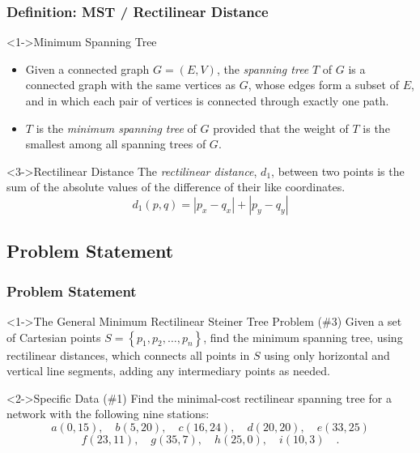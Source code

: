 \documentclass{beamer}
\begin{document}
\begin{frame}
\frametitle{Definition: MST / Rectilinear Distance}
\begin{block}<1->{Minimum Spanning Tree}
\begin{itemize}
\item<1-> {
Given a connected graph \(G = (E, V)\), the \emph{spanning tree} \(T\) of \(G\) is a connected graph with the same vertices as \(G\), whose edges form a subset of \(E\), and in which each pair of vertices is connected through exactly one path.
}
\item<2-> {
\(T\) is the \emph{minimum spanning tree} of \(G\) provided that the weight of \(T\) is the smallest among all
spanning trees of \(G\).
}
\end{itemize}	
\end{block}

\begin{block}<3->{Rectilinear Distance}
The \emph{rectilinear distance}, \(d_1\),  between two points is the sum of the absolute values of the difference of their like coordinates.
\[d_1 (p, q) = \left|p_x - q_x\right| + \left|p_y - q_y\right|\]
\end{block}
\end{frame}

\subsection{Problem Statement}
\begin{frame}
\frametitle{Problem Statement}
\begin{block}<1->{The General Minimum Rectilinear Steiner Tree Problem}
(\#3) Given a set of Cartesian points \(S = \left\{p_1, p_2, \ldots, p_n\right\}\), find the minimum
spanning tree, using rectilinear distances, which connects all points in \(S\) using only horizontal
and vertical line segments, adding any intermediary points as needed.

\end{block}
\begin{block}<2->{Specific Data}
(\#1) Find the minimal-cost rectilinear spanning tree for a network with the following nine stations:
\[a(0, 15), \quad b(5, 20), \quad c(16, 24), \quad d(20, 20), \quad e(33, 25) \] \[ f(23, 11), \quad 
g(35, 7), \quad h(25, 0), \quad i(10, 3) \quad \text{.}\]
\end{block}
\end{frame}
\end{document}
